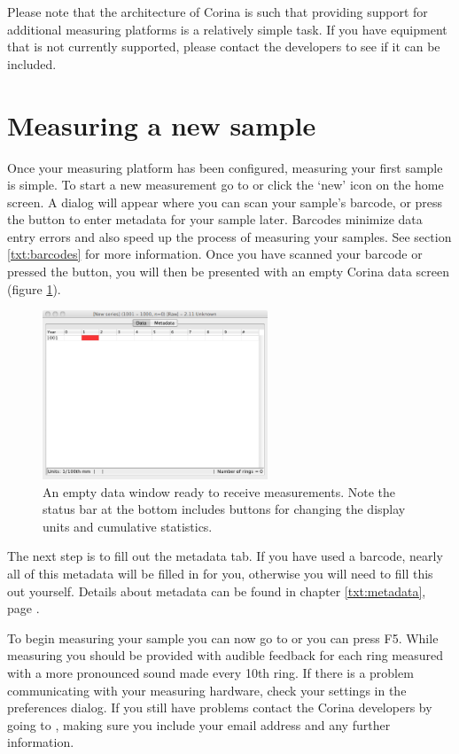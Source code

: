 Please note that the architecture of Corina is such that providing support for additional measuring platforms is a relatively simple task.  If you have equipment that is not currently supported, please contact the developers to see if it can be included.  


\section{Measuring a new sample}
Once your measuring platform has been configured, measuring your first sample is simple.  To start a new measurement go to  or click the `new' icon on the home screen. A dialog will appear where you can scan your sample's barcode, or press the button to enter metadata for your sample later. Barcodes minimize data entry errors and also speed up the process of measuring your samples. See section \ref{txt:barcodes} for more information. Once you have scanned your barcode or pressed the button, you will then be presented with an empty Corina data screen (figure \ref{fig:datascreen}).

\begin{figure}[hbtp]
  \centering
    \includegraphics[width=0.6\textwidth]{Images/datascreen.png}
    \caption{An empty data window ready to receive measurements.  Note the status bar at the bottom includes buttons for changing the display units and cumulative statistics.}
    \label{fig:datascreen}
\end{figure}

The next step is to fill out the metadata tab. If you have used a barcode, nearly all of this metadata will be filled in for you, otherwise you will need to fill this out yourself. Details about metadata can be found in chapter \ref{txt:metadata}, page \pageref{txt:metadata}.

To begin measuring your sample you can now go to  or you can press F5. While measuring you should be provided with audible feedback for each ring measured with a more pronounced sound made every 10th ring. If there is a problem communicating with your measuring hardware, check your settings in the preferences dialog. If you still have problems contact the Corina developers by going to , making sure you include your email address and any further information.


